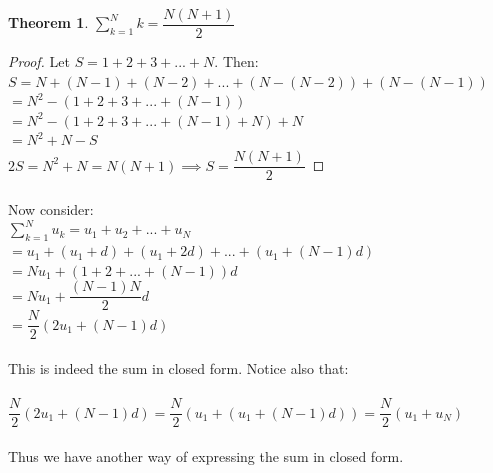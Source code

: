 \documentclass[12pt, a4paper, titlepage, twoside]{article}
\newtheorem*{theorem*}{Theorem}
\begin{document}
	\begin{pf}
		\begin{theorem*}
			$\displaystyle \sum_{k=1}^{N} k = \dfrac{N(N+1)}{2}$
		\end{theorem*}

		\tcbline		
		
		\begin{proof}
			Let $S = 1 + 2 + 3 + ... + N$. Then:\\
			
			$S = N + (N-1) + (N-2) + ... + (N-(N-2)) + (N-(N-1))$\\
			$= N^2 - (1+2+3+...+ (N-1))$\\
			$= N^2 - (1+2+3+...+ (N-1) + N) + N$\\
			$= N^2 + N - S$\\
			
			$2S = N^2 + N = N(N+1) \implies S = \dfrac{N(N+1)}{2}$
		\end{proof}
	\end{pf}
	
	\paragraph{}
	Now consider: \\
	
	$\displaystyle \sum_{k=1}^N u_k = u_1 + u_2 + ... + u_N$\\
	
	$= u_1 + (u_1 + d) + (u_1 + 2d) + ... + (u_1 + (N-1)d)$\\
	
	$= Nu_1 + (1 + 2 + ... + (N-1))d$\\
	
	$= Nu_1 + \dfrac{(N-1)N}{2}d$\\
	
	$= \dfrac{N}{2} \left(2u_1 + (N-1)d\right)$
	
	\paragraph{}
	This is indeed the sum in closed form. Notice also that:
	
	\paragraph{}
	$\dfrac{N}{2} \left(2u_1 + (N-1)d\right) = \dfrac{N}{2} \left(u_1 + (u_1 + (N-1)d)\right) = \dfrac{N}{2} \left(u_1 + u_N\right)$
	
	\paragraph{}
	Thus we have another way of expressing the sum in closed form.\\
	
\end{document}
